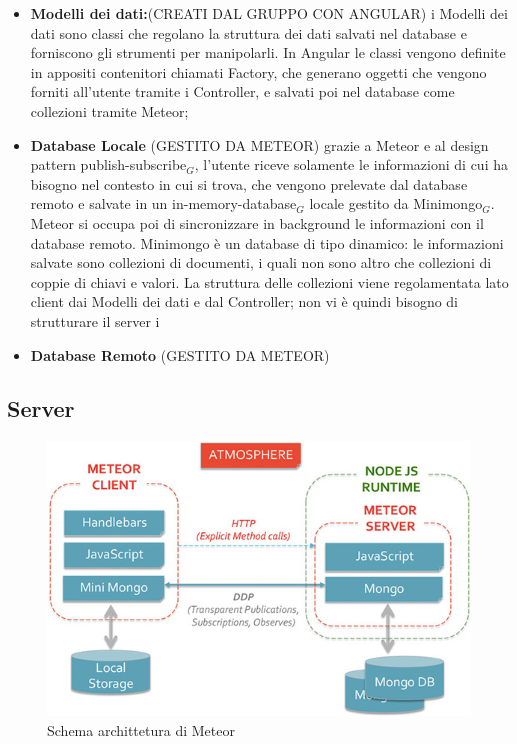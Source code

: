 \begin{itemize}
\item \textbf{Modelli dei dati:}(CREATI DAL GRUPPO CON ANGULAR) i Modelli dei dati sono classi che regolano la struttura dei dati salvati nel database e forniscono gli strumenti per manipolarli. In Angular le classi vengono definite in appositi contenitori chiamati Factory, che generano oggetti che vengono forniti all'utente tramite i Controller, e salvati poi nel database come collezioni tramite Meteor;
\item \textbf{Database Locale} (GESTITO DA METEOR) grazie a Meteor e al design pattern publish-subscribe$_G$, l'utente riceve solamente le informazioni di cui ha bisogno nel contesto in cui si trova, che vengono prelevate dal database remoto e salvate in un in-memory-database$_G$ locale gestito da Minimongo$_G$. Meteor si occupa poi di sincronizzare in background le informazioni con il database remoto. Minimongo è un database di tipo dinamico: le informazioni salvate sono collezioni di documenti, i quali non sono altro che collezioni di coppie di chiavi e valori. La struttura delle collezioni viene regolamentata lato client dai Modelli dei dati e dal Controller; non vi è quindi bisogno di strutturare il server i
\item \textbf{Database Remoto} (GESTITO DA METEOR) 
\end{itemize}



\subsection{Server}

\begin{figure}[h]
\begin{center}
\includegraphics[scale=0.70]{img/meteor_architettura.jpg}
\caption{Schema archittetura di Meteor}
\end{center}
\end{figure}

